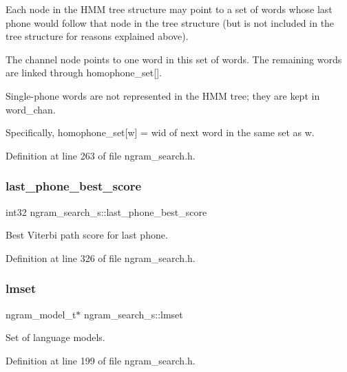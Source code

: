 Each node in the H\+MM tree structure may point to a set of words whose last phone would follow that node in the tree structure (but is not included in the tree structure for reasons explained above). 

The channel node points to one word in this set of words. The remaining words are linked through homophone\+\_\+set[].

Single-\/phone words are not represented in the H\+MM tree; they are kept in word\+\_\+chan.

Specifically, homophone\+\_\+set[w] = wid of next word in the same set as w. 

Definition at line 263 of file ngram\+\_\+search.\+h.

\mbox{\label{structngram__search__s_a81ee45f3c184568e2b5f8b79c58e0b9e}} 
\subsubsection{last\+\_\+phone\+\_\+best\+\_\+score}
{\footnotesize\ttfamily int32 ngram\+\_\+search\+\_\+s\+::last\+\_\+phone\+\_\+best\+\_\+score}



Best Viterbi path score for last phone. 



Definition at line 326 of file ngram\+\_\+search.\+h.

\mbox{\label{structngram__search__s_a6127a6d8fb53832e67456c11aa6ad9c4}} 
\subsubsection{lmset}
{\footnotesize\ttfamily ngram\+\_\+model\+\_\+t$\ast$ ngram\+\_\+search\+\_\+s\+::lmset}



Set of language models. 



Definition at line 199 of file ngram\+\_\+search.\+h.

\mbox{\label{structngram__search__s_a5255e56d28c239a4e1d9b1721e8a2f8d}} 
